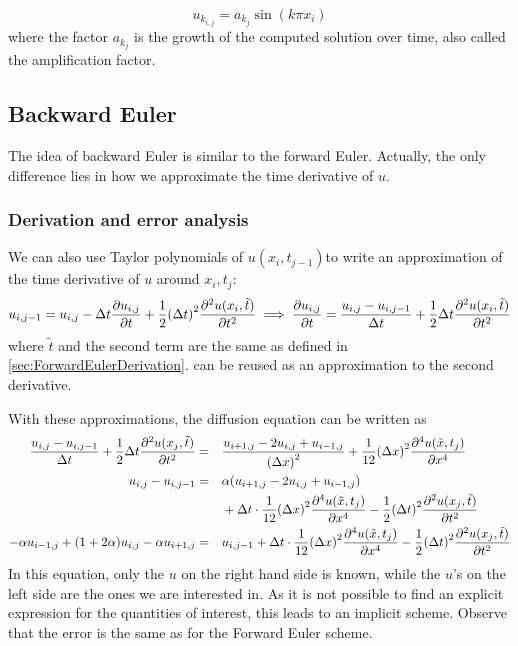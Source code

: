 \documentclass[12pt,english,a4paper]{article}
\begin{document}
\[
u_{k_{i,j}} = a_{k_{j}}\sin(k \pi x_i)
\]
where the factor \(a_{k_j}\) is the growth of the computed solution over time, also called the amplification factor.
%
\subsection{Backward Euler} \label{sec:backwardEuler}
The idea of backward Euler is similar to the forward Euler. Actually, the only difference lies in how we approximate the time derivative of \(u\).
\subsubsection{Derivation and error analysis}
We can also use Taylor polynomials of \(u(x_i,t_{j-1})\)to write an approximation of the time derivative of \(u\) around \(x_i,t_j\):
\[
    u_{i,j-1} = u_{i,j} - \Delta t\pdv{u_{i,j}}{t} + \frac{1}{2}\qty(\Delta t)^2\pdv[2]{u(x_i,\tilde{t})}{t}
    \implies \pdv{u_{i,j}}{t} = \frac{u_{i,j}-u_{i,j-1}}{\Delta t} + \frac{1}{2}\Delta t\pdv[2]{u(x_i,\tilde{t})}{t}
\]
where \(\tilde{t}\) and the second term are the same as defined in \vref{sec:ForwardEulerDerivation}.  can be reused as an approximation to the second derivative.

With these approximations, the diffusion equation can be written as
\begin{alignat*}{2}
    \frac{u_{i,j}-u_{i,j-1}}{\Delta t} + \frac{1}{2}\Delta t\pdv[2]{u(x_j,\tilde{t})}{t}
    &=&& \frac{u_{i+1,j}  - 2u_{i,j} + u_{i-1,j}}{\qty(\Delta x)^2} + \frac{1}{12}\qty(\Delta x)^2\pdv[4]{u(\tilde{x},t_j)}{x}  \\
    u_{i,j}-u_{i,j-1} &=&& \alpha(u_{i+1,j}  - 2u_{i,j} + u_{i-1,j})\\
    &&& + \Delta t\cdot \frac{1}{12}\qty(\Delta x)^2\pdv[4]{u(\tilde{x},t_j)}{x}  - \frac{1}{2}\qty(\Delta t)^2\pdv[2]{u(x_j,\tilde{t})}{t}\\
    -\alpha u_{i-1,j} + \qty(1+2\alpha)u_{i,j} - \alpha u_{i+1,j} &=&& u_{i,j-1} + \Delta t\cdot \frac{1}{12}\qty(\Delta x)^2\pdv[4]{u(\tilde{x},t_j)}{x}  - \frac{1}{2}\qty(\Delta t)^2\pdv[2]{u(x_j,\tilde{t})}{t}
\end{alignat*}
In this equation, only the \(u\) on the right hand side is known, while the \(u\)'s on the left side are the ones we are interested in. As it is not possible to find an explicit expression for the quantities of interest, this leads to an implicit scheme. Observe that the error is the same as for the Forward Euler scheme.
\end{document}
